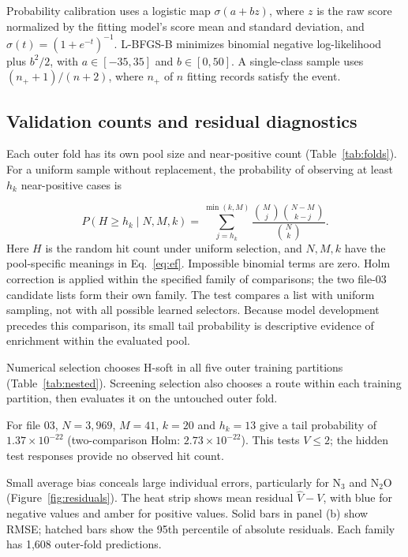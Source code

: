 Probability calibration uses a logistic map $\sigma(a+bz)$, where $z$ is the raw score normalized by the fitting model's score mean and standard deviation, and $\sigma(t)=(1+e^{-t})^{-1}$. L-BFGS-B minimizes binomial negative log-likelihood plus $b^2/2$, with $a\in[-35,35]$ and $b\in[0,50]$. A single-class sample uses $(n_++1)/(n+2)$, where $n_+$ of $n$ fitting records satisfy the event.
\FloatBarrier

\subsection{Validation counts and residual diagnostics}\label{app:validation}
Each outer fold has its own pool size and near-positive count (Table~\ref{tab:folds}). For a uniform sample without replacement, the probability of observing at least $h_k$ near-positive cases is
\begin{samepage}
\begin{equation}
 P(H\ge h_k\mid N,M,k)=
 \sum_{j=h_k}^{\min(k,M)}
 \frac{\binom{M}{j}\binom{N-M}{k-j}}{\binom{N}{k}}.
 \label{eq:hypergeom}
\end{equation}
\noindent Here $H$ is the random hit count under uniform selection, and $N,M,k$ have the pool-specific meanings in Eq.~\eqref{eq:ef}. Impossible binomial terms are zero. Holm correction is applied within the specified family of comparisons; the two file-03 candidate lists form their own family. The test compares a list with uniform sampling, not with all possible learned selectors. Because model development precedes this comparison, its small tail probability is descriptive evidence of enrichment within the evaluated pool.
\end{samepage}


Numerical selection chooses H-soft in all five outer training partitions (Table~\ref{tab:nested}). Screening selection also chooses a route within each training partition, then evaluates it on the untouched outer fold.

\begin{samepage}
For file 03, $N=3{,}969$, $M=41$, $k=20$ and $h_k=13$ give a tail probability of $1.37\times10^{-22}$ (two-comparison Holm: $2.73\times10^{-22}$). This tests $V\le2$; the hidden test responses provide no observed hit count.\par
\end{samepage}

Small average bias conceals large individual errors, particularly for $\mathrm{N_3}$ and $\mathrm{N_2O}$ (Figure~\ref{fig:residuals}). The heat strip shows mean residual $\widehat V-V$, with blue for negative values and amber for positive values. Solid bars in panel (b) show RMSE; hatched bars show the 95th percentile of absolute residuals. Each family has 1,608 outer-fold predictions.
\FloatBarrier

